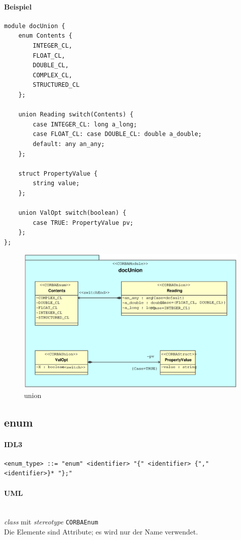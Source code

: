 \documentclass [a4paper,10pt] {scrartcl}
\begin{document}
\paragraph{Beispiel}
\begin{verbatim}
module docUnion {
    enum Contents {
        INTEGER_CL,
        FLOAT_CL,
        DOUBLE_CL,
        COMPLEX_CL,
        STRUCTURED_CL
    };

    union Reading switch(Contents) {
        case INTEGER_CL: long a_long;
        case FLOAT_CL: case DOUBLE_CL: double a_double;
        default: any an_any;
    };

    struct PropertyValue {
        string value;
    };

    union ValOpt switch(boolean) {
        case TRUE: PropertyValue pv;
    };
};
\end{verbatim}
\begin{figure}[!h]
\centerline{\includegraphics[width=1.2 \linewidth]{docUnion.eps}}
\caption{union}
\label{fig:union}
\end{figure}

\cleardoublepage
\subsection{enum}
\paragraph{IDL3}
\begin{verbatim}
<enum_type> ::= "enum" <identifier> "{" <identifier> {"," <identifier>}* "};"
\end{verbatim}
\paragraph{UML}~\\
\emph{class} mit \emph{stereotype} \texttt{CORBAEnum}\\
Die Elemente sind Attribute; es wird nur der Name verwendet.\\
\end{document}

